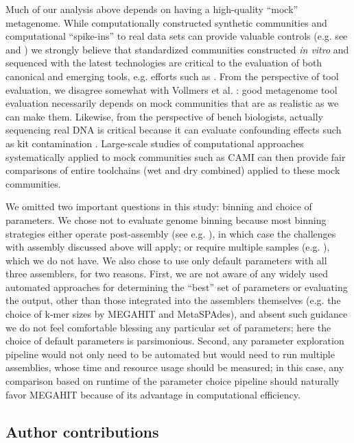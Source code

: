 \documentclass[11pt]{article}
\begin{document}
Much of our analysis above depends on having a high-quality ``mock''
metagenome.  While computationally constructed synthetic communities
and computational ``spike-ins'' to real data sets can provide valuable
controls (e.g. see \cite{metag_one} and \cite{ahowe2014}) we strongly
believe that standardized communities constructed {\em in vitro} and
sequenced with the latest technologies are critical to the evaluation
of both canonical and emerging tools, e.g. efforts such as
\cite{Brown2017}. From the perspective of tool evaluation, we
disagree somewhat with Vollmers et al. \cite{Vollmers2017}: good
metagenome tool evaluation necessarily depends on mock communities
that are as realistic as we can make them.  Likewise, from the
perspective of bench biologists, actually sequencing real DNA is
critical because it can evaluate confounding effects such as kit
contamination \cite{Salter2014}.  Large-scale studies of computational
approaches systematically applied to mock communities such as CAMI
\cite{CAMI} can then provide fair comparisons of entire toolchains
(wet and dry combined) applied to these mock communities.


We omitted two important questions in this study: binning and choice
of parameters.  We chose not to evaluate genome binning because most
binning strategies either operate post-assembly (see
e.g. \cite{laczny2017busybee}), in which case the challenges with
assembly discussed above will apply; or require multiple samples
(e.g. \cite{Cleary2015}), which we do not have.  We also chose to use
only default parameters with all three assemblers, for two reasons.
First, we are not aware of any widely used automated approaches for
determining the ``best'' set of parameters or evaluating the output,
other than those integrated into the assemblers themselves (e.g. the
choice of k-mer sizes by MEGAHIT and MetaSPAdes), and absent such
guidance we do not feel comfortable blessing any particular set of
parameters; here the choice of default parameters is parsimonious.
Second, any parameter exploration pipeline would not only need to be
automated but would need to run multiple assemblies, whose time and
resource usage should be measured; in this case, any comparison based
on runtime of the parameter choice pipeline should naturally favor
MEGAHIT because of its advantage in computational efficiency.

\subsection*{Author contributions}
\end{document}
